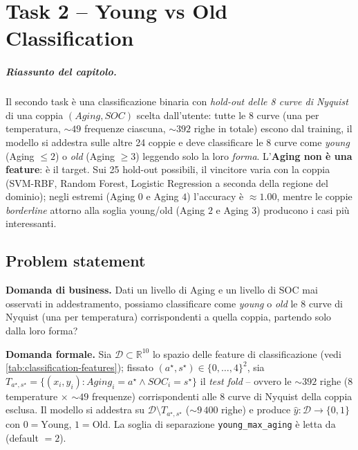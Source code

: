 \chapter{Task 2 -- Young vs Old Classification}
\label{chap:task2}

\paragraph{Riassunto del capitolo.} Il secondo task è una classificazione
binaria con \emph{hold-out delle 8 curve di Nyquist} di una coppia
$(Aging, SOC)$ scelta dall'utente: tutte le 8 curve (una per
temperatura, ${\sim}49$ frequenze ciascuna, ${\sim}392$ righe in totale)
escono dal training, il modello si addestra sulle altre 24 coppie e
deve classificare le 8 curve come \emph{young} (Aging $\leq 2$) o
\emph{old} (Aging $\geq 3$) leggendo solo la loro \emph{forma}.
L'\textbf{Aging non è una feature}: è il target. Sui 25 hold-out
possibili, il vincitore varia con la coppia (SVM-RBF, Random Forest,
Logistic Regression a seconda della regione del dominio); negli estremi
(Aging $0$ e Aging $4$) l'accuracy è $\approx 1.00$, mentre le coppie
\emph{borderline} attorno alla soglia young/old (Aging $2$ e Aging $3$)
producono i casi più interessanti.

\section{Problem statement}

\textbf{Domanda di business.} Dati un livello di Aging e un livello di
SOC mai osservati in addestramento, possiamo classificare come
\emph{young} o \emph{old} le 8 curve di Nyquist (una per temperatura)
corrispondenti a quella coppia, partendo solo dalla loro forma?

\textbf{Domanda formale.} Sia $\mathcal{D} \subset \mathbb{R}^{10}$ lo
spazio delle feature di classificazione (vedi
\cref{tab:classification-features}); fissato $(a^\star, s^\star) \in
\{0,\dots,4\}^2$, sia $T_{a^\star,s^\star} = \{(x_i, y_i): Aging_i = a^\star
\land SOC_i = s^\star\}$ il \emph{test fold} -- ovvero le ${\sim}392$
righe (8 temperature $\times$ ${\sim}49$ frequenze) corrispondenti alle
8 curve di Nyquist della coppia esclusa. Il modello si addestra su
$\mathcal{D} \setminus T_{a^\star,s^\star}$ (${\sim}9\,400$ righe) e
produce $\hat{y}: \mathcal{D} \to \{0, 1\}$ con $0 = \text{Young}$,
$1 = \text{Old}$. La soglia di separazione
\texttt{young\_max\_aging} è letta da 
(default $= 2$).

